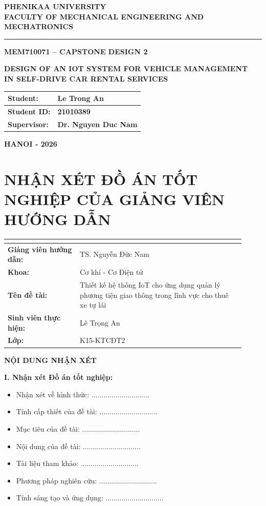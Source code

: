 \documentclass[13pt,a4paper]{extarticle}
\newcounter{none} %
\newcommand{\thesislongtableorignewline}{}
\let\thesislongtableorignewline\\
\renewcommand{\\}{\thesislongtableorignewline\hline}%
\let\\\thesislongtableorignewline
\newcommand{\majorheading}[1]{\clearpage\section*{#1}}
\providecommand{\tightlist}{%
  \setlength{\itemsep}{0pt}\setlength{\parskip}{0pt}}
\begin{document}
\thispagestyle{empty}
\begin{center}
\textbf{PHENIKAA UNIVERSITY}\\
\textbf{FACULTY OF MECHANICAL ENGINEERING AND MECHATRONICS}\\[0.25cm]
\rule{0.55\linewidth}{0.6pt}
\vspace*{1.8cm}

\textbf{MEM710071 -- CAPSTONE DESIGN 2}
\vspace*{1.8cm}

{\Large\textbf{DESIGN OF AN IOT SYSTEM FOR VEHICLE MANAGEMENT}}\\
{\Large\textbf{IN SELF-DRIVE CAR RENTAL SERVICES}}
\vfill

\begin{tabular}{|l|l|}
\hline
\textbf{Student:} & \textbf{Le Trong An} \\
\hline
\textbf{Student ID:} & \textbf{21010389} \\
\hline
\textbf{Supervisor:} & \textbf{Dr. Nguyen Duc Nam} \\
\hline
\end{tabular}

\vspace{1.0cm}
\textbf{HANOI - 2026}
\end{center}
\clearpage

\majorheading{NHẬN XÉT ĐỒ ÁN TỐT NGHIỆP CỦA GIẢNG VIÊN HƯỚNG DẪN}

{\def\LTcaptype{none} %
\begin{longtable}{|p{0.28\linewidth}|p{0.64\linewidth}|}
\hline \textbf{} & \textbf{} \\
\hline
\endhead
\hline
\endlastfoot
\textbf{Giảng viên hướng dẫn:} & TS. Nguyễn Đức Nam \\
\textbf{Khoa:} & Cơ khí - Cơ Điện tử \\
\textbf{Tên đề tài:} & Thiết kế hệ thống IoT cho ứng dụng quản lý phương
tiện giao thông trong lĩnh vực cho thuê xe tự lái \\
\textbf{Sinh viên thực hiện:} & Lê Trọng An \\
\textbf{Lớp:} & K15-KTCĐT2 \\
\end{longtable}
}

\textbf{NỘI DUNG NHẬN XÉT}

\textbf{I. Nhận xét Đồ án tốt nghiệp:}

\begin{itemize}
\tightlist
\item
  Nhận xét về hình thức: .............................
\item
  Tính cấp thiết của đề tài: .............................
\item
  Mục tiêu của đề tài: .............................
\item
  Nội dung của đề tài: .............................
\item
  Tài liệu tham khảo: .............................
\item
  Phương pháp nghiên cứu: .............................
\item
  Tính sáng tạo và ứng dụng: .............................
\end{itemize}
\end{document}
